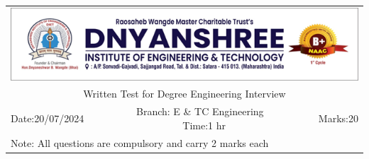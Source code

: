 \documentclass[a4, 12pt, addpoints]{exam}
\begin{document}
\def\arraystretch{1}
\begin{longtable}{lp{}p{}r}
\multicolumn{4}{c}{\includegraphics[width= \textwidth]{dietlogo}} \\ 
\multicolumn{4}{c}{Written Test for Degree Engineering Interview} \\
Date:20/07/2024 & \multicolumn{2}{c}{ ~~~Branch: E \& TC Engineering ~~~~ Time:1 hr} & Marks:20 \\
\multicolumn{4}{l}{ Note: All questions are compulsory and carry 2 marks each  } \\ \hline
\end{longtable}
\end{document}
